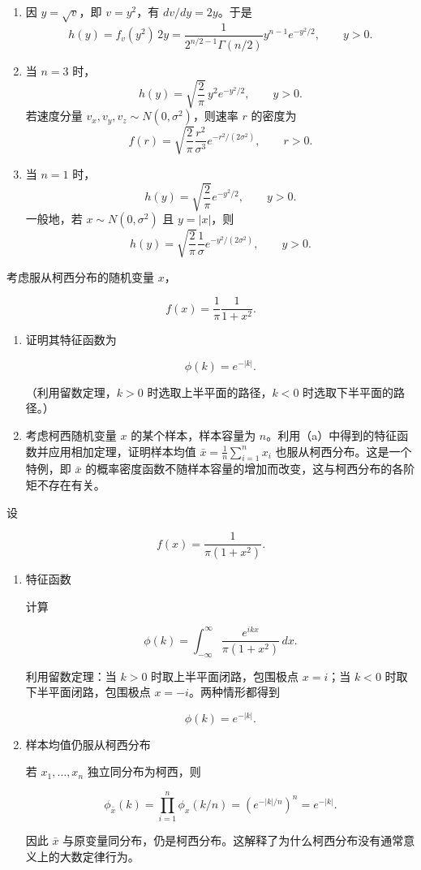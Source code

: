 \begin{question}
\begin{solution}
\begin{enumerate}
\item 因 \(y=\sqrt v\)，即 \(v=y^2\)，有 \(dv/dy=2y\)。于是
\[
h(y)=f_v(y^2)\,2y
=\frac{1}{2^{n/2-1}\Gamma(n/2)}y^{n-1}e^{-y^2/2},
\qquad y>0.
\]

\item 当 \(n=3\) 时，
\[
h(y)=\sqrt{\frac{2}{\pi}}\,y^2e^{-y^2/2},\qquad y>0.
\]
若速度分量 \(v_x,v_y,v_z\sim N(0,\sigma^2)\)，则速率 \(r\) 的密度为
\[
f(r)=\sqrt{\frac{2}{\pi}}\frac{r^2}{\sigma^3}e^{-r^2/(2\sigma^2)},\qquad r>0.
\]

\item 当 \(n=1\) 时，
\[
h(y)=\sqrt{\frac{2}{\pi}}e^{-y^2/2},\qquad y>0.
\]
一般地，若 \(x\sim N(0,\sigma^2)\) 且 \(y=|x|\)，则
\[
h(y)=\sqrt{\frac{2}{\pi}}\frac1{\sigma}e^{-y^2/(2\sigma^2)},\qquad y>0.
\]
\end{enumerate}
\end{solution}
\end{question}



\begin{question}
考虑服从柯西分布的随机变量 \(x\)，

\[
f(x)=\frac{1}{\pi}\frac{1}{1+x^2}.
\]

\begin{enumerate}
\item 证明其特征函数为

\[
\phi(k)=e^{-|k|}.
\]

（利用留数定理，\(k>0\) 时选取上半平面的路径，\(k<0\)
时选取下半平面的路径。）

\item 考虑柯西随机变量 \(x\) 的某个样本，样本容量为
\(n\)。利用（a）中得到的特征函数并应用相加定理，证明样本均值
\(\bar x=\frac1n\sum_{i=1}^{n}x_i\) 也服从柯西分布。这是一个特例，即
\(\bar x\)
的概率密度函数不随样本容量的增加而改变，这与柯西分布的各阶矩不存在有关。
\end{enumerate}
\begin{solution}
设

\[
f(x)=\frac{1}{\pi(1+x^2)}.
\]

\begin{enumerate}
\item 特征函数

计算

\[
\phi(k)=\int_{-\infty}^{\infty}\frac{e^{ikx}}{\pi(1+x^2)}\,dx.
\]

利用留数定理：当 \(k>0\) 时取上半平面闭路，包围极点 \(x=i\)；当 \(k<0\)
时取下半平面闭路，包围极点 \(x=-i\)。两种情形都得到

\[
\phi(k)=e^{-|k|}.
\]

\item 样本均值仍服从柯西分布

若 \(x_1,\dots,x_n\) 独立同分布为柯西，则

\[
\phi_{\bar x}(k)
=\prod_{i=1}^n \phi_x(k/n)
=\left(e^{-|k|/n}\right)^n
=e^{-|k|}.
\]

因此 \(\bar x\)
与原变量同分布，仍是柯西分布。这解释了为什么柯西分布没有通常意义上的大数定律行为。
\end{enumerate}
\end{solution}
\end{question}



